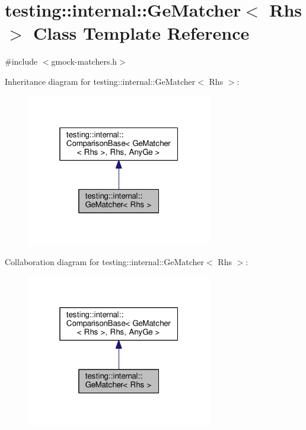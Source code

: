 \hypertarget{classtesting_1_1internal_1_1GeMatcher}{}\section{testing\+:\+:internal\+:\+:Ge\+Matcher$<$ Rhs $>$ Class Template Reference}
\label{classtesting_1_1internal_1_1GeMatcher}


{\ttfamily \#include $<$gmock-\/matchers.\+h$>$}



Inheritance diagram for testing\+:\+:internal\+:\+:Ge\+Matcher$<$ Rhs $>$\+:\nopagebreak
\begin{figure}[H]
\begin{center}
\leavevmode
\includegraphics[width=229pt]{classtesting_1_1internal_1_1GeMatcher__inherit__graph}
\end{center}
\end{figure}


Collaboration diagram for testing\+:\+:internal\+:\+:Ge\+Matcher$<$ Rhs $>$\+:\nopagebreak
\begin{figure}[H]
\begin{center}
\leavevmode
\includegraphics[width=229pt]{classtesting_1_1internal_1_1GeMatcher__coll__graph}
\end{center}
\end{figure}
